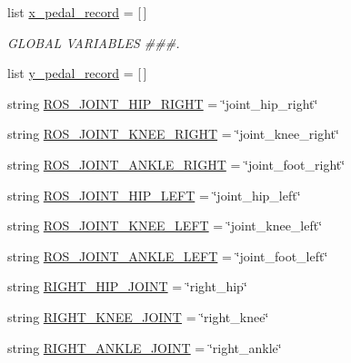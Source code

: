 \begin{DoxyCompactItemize}
\item 
list \mbox{\hyperlink{namespacepedal__simulation_a85aede234b0b86c615af4f9d73a3d148}{x\+\_\+pedal\+\_\+record}} = \mbox{[}$\,$\mbox{]}
\begin{DoxyCompactList}\small\item\em G\+L\+O\+B\+AL V\+A\+R\+I\+A\+B\+L\+ES \#\#\#. \end{DoxyCompactList}\item 
list \mbox{\hyperlink{namespacepedal__simulation_ad56ea447f391114ab2b382becbe2bc59}{y\+\_\+pedal\+\_\+record}} = \mbox{[}$\,$\mbox{]}
\item 
string \mbox{\hyperlink{namespacepedal__simulation_aa2d21a54aac1c1e059d8a17050ddfed4}{R\+O\+S\+\_\+\+J\+O\+I\+N\+T\+\_\+\+H\+I\+P\+\_\+\+R\+I\+G\+HT}} = \char`\"{}joint\+\_\+hip\+\_\+right\char`\"{}
\item 
string \mbox{\hyperlink{namespacepedal__simulation_ad8c24ef49f1c476e1ad8be5bc4d1c710}{R\+O\+S\+\_\+\+J\+O\+I\+N\+T\+\_\+\+K\+N\+E\+E\+\_\+\+R\+I\+G\+HT}} = \char`\"{}joint\+\_\+knee\+\_\+right\char`\"{}
\item 
string \mbox{\hyperlink{namespacepedal__simulation_a091f63fe58d9a41b150f5029e548f08f}{R\+O\+S\+\_\+\+J\+O\+I\+N\+T\+\_\+\+A\+N\+K\+L\+E\+\_\+\+R\+I\+G\+HT}} = \char`\"{}joint\+\_\+foot\+\_\+right\char`\"{}
\item 
string \mbox{\hyperlink{namespacepedal__simulation_a6caf046a25da8884a3feed405121b7db}{R\+O\+S\+\_\+\+J\+O\+I\+N\+T\+\_\+\+H\+I\+P\+\_\+\+L\+E\+FT}} = \char`\"{}joint\+\_\+hip\+\_\+left\char`\"{}
\item 
string \mbox{\hyperlink{namespacepedal__simulation_ada493a22ef9aa6120fb10a58db55e10d}{R\+O\+S\+\_\+\+J\+O\+I\+N\+T\+\_\+\+K\+N\+E\+E\+\_\+\+L\+E\+FT}} = \char`\"{}joint\+\_\+knee\+\_\+left\char`\"{}
\item 
string \mbox{\hyperlink{namespacepedal__simulation_a402a36b90d4ebf203bc19976ec7d52c6}{R\+O\+S\+\_\+\+J\+O\+I\+N\+T\+\_\+\+A\+N\+K\+L\+E\+\_\+\+L\+E\+FT}} = \char`\"{}joint\+\_\+foot\+\_\+left\char`\"{}
\item 
string \mbox{\hyperlink{namespacepedal__simulation_a90d2f00ff0e334bc02f23bcd4b540d8c}{R\+I\+G\+H\+T\+\_\+\+H\+I\+P\+\_\+\+J\+O\+I\+NT}} = \char`\"{}right\+\_\+hip\char`\"{}
\item 
string \mbox{\hyperlink{namespacepedal__simulation_a28d4609f3a19f8e565ae3548ef73f990}{R\+I\+G\+H\+T\+\_\+\+K\+N\+E\+E\+\_\+\+J\+O\+I\+NT}} = \char`\"{}right\+\_\+knee\char`\"{}
\item 
string \mbox{\hyperlink{namespacepedal__simulation_a277daee547841cc41def2598a8beb6f1}{R\+I\+G\+H\+T\+\_\+\+A\+N\+K\+L\+E\+\_\+\+J\+O\+I\+NT}} = \char`\"{}right\+\_\+ankle\char`\"{}

\end{DoxyCompactItemize}
